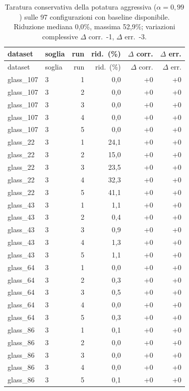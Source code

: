 \scriptsize
\begin{longtable}{@{}llrrrr@{}}
\caption{Taratura conservativa della potatura aggressiva ($\alpha = 0{,}99$) sulle 97 configurazioni con baseline disponibile. Riduzione mediana 0,0\si{\percent}, massima 52,9\si{\percent}; variazioni complessive $\Delta$ corr.\ -1, $\Delta$ err.\ -3.}
\label{tab:app-a99}\\
\toprule
dataset & soglia & run & rid.\ (\si{\percent}) & $\Delta$ corr. & $\Delta$ err. \\
\midrule
\endfirsthead
\toprule
dataset & soglia & run & rid.\ (\si{\percent}) & $\Delta$ corr. & $\Delta$ err. \\
\midrule
\endhead
\bottomrule
\endlastfoot
glass\_107 & 3 & 1 & 0,0 & +0 & +0 \\
glass\_107 & 3 & 2 & 0,0 & +0 & +0 \\
glass\_107 & 3 & 3 & 0,0 & +0 & +0 \\
glass\_107 & 3 & 4 & 0,0 & +0 & +0 \\
glass\_107 & 3 & 5 & 0,0 & +0 & +0 \\
glass\_22 & 3 & 1 & 24,1 & +0 & +0 \\
glass\_22 & 3 & 2 & 15,0 & +0 & +0 \\
glass\_22 & 3 & 3 & 23,5 & +0 & +0 \\
glass\_22 & 3 & 4 & 32,3 & +0 & +0 \\
glass\_22 & 3 & 5 & 41,1 & +0 & +0 \\
glass\_43 & 3 & 1 & 1,1 & +0 & +0 \\
glass\_43 & 3 & 2 & 0,4 & +0 & +0 \\
glass\_43 & 3 & 3 & 0,9 & +0 & +0 \\
glass\_43 & 3 & 4 & 1,3 & +0 & +0 \\
glass\_43 & 3 & 5 & 1,1 & +0 & +0 \\
glass\_64 & 3 & 1 & 0,0 & +0 & +0 \\
glass\_64 & 3 & 2 & 0,3 & +0 & +0 \\
glass\_64 & 3 & 3 & 0,5 & +0 & +0 \\
glass\_64 & 3 & 4 & 0,0 & +0 & +0 \\
glass\_64 & 3 & 5 & 0,3 & +0 & +0 \\
glass\_86 & 3 & 1 & 0,1 & +0 & +0 \\
glass\_86 & 3 & 2 & 0,0 & +0 & +0 \\
glass\_86 & 3 & 3 & 0,0 & +0 & +0 \\
glass\_86 & 3 & 4 & 0,0 & +0 & +0 \\
glass\_86 & 3 & 5 & 0,1 & +0 & +0 \\

\end{longtable}
